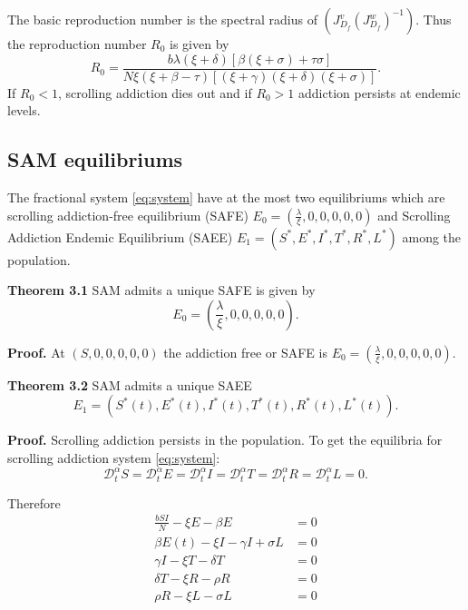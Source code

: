 \documentclass[10pt]{article}
\newcommand{\CD}{\mathcal{D}}
\begin{document}
	The basic reproduction number is the spectral radius of $\left( J_{D_{f}}^{v}(J_{D_{f}}^{w})^{-1} \right)$. Thus the reproduction number $R_{0}$ is given by
	\begin{equation}
		R_{0} = \frac{b \lambda(\xi + \delta)[\beta (\xi + \sigma) + \tau\sigma]}{N\xi(\xi + \beta - \tau)[(\xi + \gamma)(\xi + \delta) (\xi + \sigma)]}.
		\label{eq:R0}
	\end{equation}
	If $R_{0} < 1$, scrolling addiction dies out and if $R_{0} > 1$ addiction persists at endemic levels.
	
	\subsection{SAM equilibriums}
	
	The fractional system \eqref{eq:system} have at the most two equilibriums which are scrolling addiction-free equilibrium (SAFE) $E_{0} = (\frac{\lambda}{\xi},0,0,0,0,0)$ and Scrolling Addiction Endemic Equilibrium (SAEE) $E_{1} = (S^{\ast},E^{\ast},I^{\ast},T^{\ast},R^{\ast},L^{\ast})$ among the population.
	
	\textbf{Theorem 3.1} SAM admits a unique SAFE is given by 
	\begin{equation}
		E_{0} = \left(\frac{\lambda}{\xi},0,0,0,0,0\right).
		\label{eq:E0}
	\end{equation}
	
	\textbf{Proof.} At $(S,0,0,0,0,0)$ the addiction free or SAFE is $E_{0} = (\frac{\lambda}{\xi},0,0,0,0,0).$
	
	\textbf{Theorem 3.2} SAM admits a unique SAEE 
	\begin{equation}
		E_{1} = (S^{\ast}(t),E^{\ast}(t),I^{\ast}(t),T^{\ast}(t),R^{\ast}(t),L^{\ast}(t)).
		\label{eq:E1}
	\end{equation}
	
	\textbf{Proof.} Scrolling addiction persists in the population. To get the equilibria for scrolling addiction system \eqref{eq:system}:
	\begin{equation}
		\CD_{t}^{\alpha} S = \CD_{t}^{\alpha} E = \CD_{t}^{\alpha} I = \CD_{t}^{\alpha} T = \CD_{t}^{\alpha} R = \CD_{t}^{\alpha} L = 0.
		\label{eq:steady}
	\end{equation}
	
	Therefore
	\begin{align}
		\frac{b SI}{N} - \xi E - \beta E &= 0 \label{eq:steadyE} \\
		\beta E(t) - \xi I - \gamma I + \sigma L &= 0 \label{eq:steadyI} \\
		\gamma I - \xi T - \delta T &= 0 \label{eq:steadyT} \\
		\delta T - \xi R - \rho R &= 0 \label{eq:steadyR} \\
		\rho R - \xi L - \sigma L &= 0 \label{eq:steadyL}
	\end{align}
	
\end{document}
